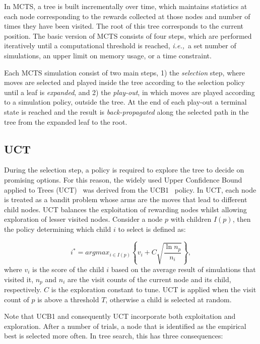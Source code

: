 \documentclass[a4paper]{llncs}
\newcommand{\ie}{{\it i.e.,}~}
\begin{document}
In MCTS, a tree is built incrementally over time, which maintains statistics at each node corresponding to the rewards collected at those nodes and number of times they have been visited. The root of this tree corresponds to the current position. The basic version of MCTS consists of four steps, which are performed iteratively until a computational threshold is reached, \ie a set number of simulations, an upper limit on memory usage, or a time constraint. 

Each MCTS simulation consist of two main steps, 1) the \emph{selection} step, where moves are selected and played inside the tree according to the selection policy until a leaf is \emph{expanded}, and 2) the \emph{play-out}, in which moves are played according to a simulation policy, outside the tree. At the end of each play-out a terminal state is reached and the result is \emph{back-propagated} along the selected path in the tree from the expanded leaf to the root.

\subsection{UCT}
\label{subsec:uct}
During the selection step, a policy is required to explore the tree to decide on promising options. For this reason, the widely used Upper Confidence Bound applied to Trees (UCT)~\cite{kocsis2006bandit} was derived from the UCB1~\cite{auer2002using} policy. In UCT, each node is treated as a bandit problem whose arms are the moves that lead to different child nodes. UCT balances the exploitation of rewarding nodes whilst allowing exploration of lesser visited nodes. Consider a node $p$ with children $I(p)$, then the policy determining which child $i$ to select is defined as:

\begin{equation}
\label{eq:uct}
i^* = argmax_{i \in I(p)}\left\{ v_i + C \sqrt{ \frac{\ln{n_p}}{n_i}}\right\},
\end{equation}
where $v_i$ is the score of the child $i$ based on the average result of simulations that visited it, $n_p$ and $n_i$ are the visit counts of the current node and its child, respectively. $C$ is the exploration constant to tune. UCT is applied when the visit count of $p$ is above a threshold $T$, otherwise a child is selected at random.

Note that UCB1 and consequently UCT incorporate both exploitation and exploration. After a number of trials, a node that is identified as the empirical best is selected more often. In tree search, this has three consequences:
\end{document}
